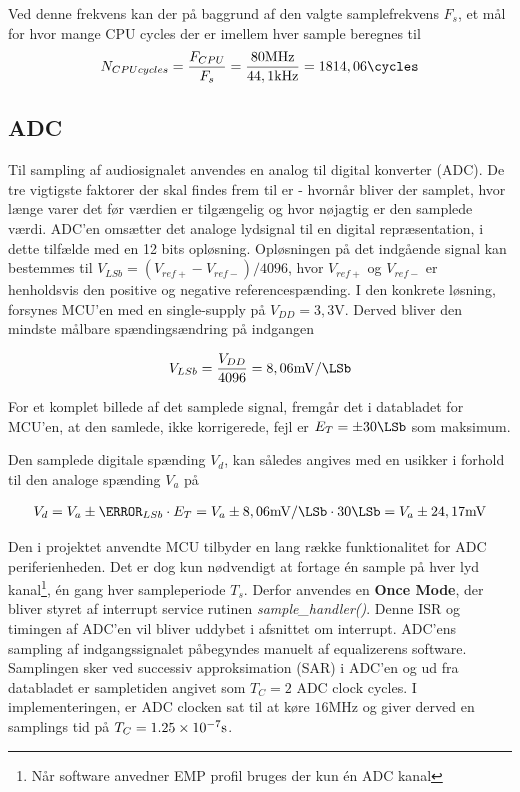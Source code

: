Ved denne frekvens kan der på baggrund af den valgte samplefrekvens $F_s$, et mål for hvor mange CPU cycles der er imellem hver sample beregnes til
\begin{align}
N_{CPU cycles} = \frac{F_{CPU}}{F_s}  =  \frac{80\si{\mega\hertz}}{44,1\si{\kilo\hertz}}  = 1814,06 \si{\cycles}
\end{align}

\subsection{ADC}
Til sampling af audiosignalet anvendes en analog til digital konverter (ADC). 
De tre vigtigste faktorer der skal findes frem til er - hvornår bliver der samplet, hvor længe varer det før værdien er tilgængelig og hvor nøjagtig er den samplede værdi.
ADC'en omsætter det analoge lydsignal til en digital repræsentation, i dette tilfælde med en 12 bits opløsning.
Opløsningen på det indgående signal kan bestemmes til $V_{LSb} = (V_{ref+} - V_{ref-} ) / 4096 $, hvor $V_{ref+}$ og $V_{ref-}$ er henholdsvis den positive og negative referencespænding.
I den konkrete løsning, forsynes MCU'en med en single-supply på $V_{DD} = 3,3\si{\volt}$.
Derved bliver den mindste målbare spændingsændring på indgangen

\begin{align}
V_{LSb} = \frac{V_{DD}}{4096} = 8,06\si{\milli\volt\per\LSb}
\end{align}

For et komplet billede af det samplede signal, fremgår det i databladet \cite[afsnit 24.14 s. 1383]{tm4c123gh6pm} for MCU'en, at
den samlede, ikke korrigerede, fejl er $E_T = \pm 30\si{\LSb}$ som maksimum.

Den samplede digitale spænding $V_{d}$, kan således angives med en usikker i forhold til den analoge spænding $V_{a}$ på

\begin{align}
V_{d} = V_{a} \pm \V_{LSb} \cdot E_T = V_{a} \pm   8,06\si{\milli\volt\per\LSb} \cdot 30 \si{\LSb} = V_{a} \pm 24,17\si{\milli\volt}
\end{align} 

Den i projektet anvendte MCU tilbyder en lang række funktionalitet for ADC periferienheden.
Det er dog kun nødvendigt at fortage én sample på hver lyd kanal\footnote{Når software anvedner EMP profil bruges der kun én ADC kanal}, én gang hver sampleperiode $T_s$.
Derfor anvendes en \textbf{Once Mode}, der bliver styret af interrupt service rutinen \textit{sample\_handler()}. Denne ISR og timingen af ADC'en vil bliver uddybet i afsnittet om interrupt.
ADC'ens sampling af indgangssignalet påbegyndes manuelt af equalizerens software.
Samplingen sker ved successiv approksimation (SAR) i ADC'en og ud fra databladet er sampletiden angivet som  $T_C = 2$ ADC clock cycles. 
I implementeringen, er ADC clocken sat til at køre $16 \si{\mega\hertz}$ og giver derved en samplings tid på $T_C = \num{1,25E-7}\si{\second}$.  

